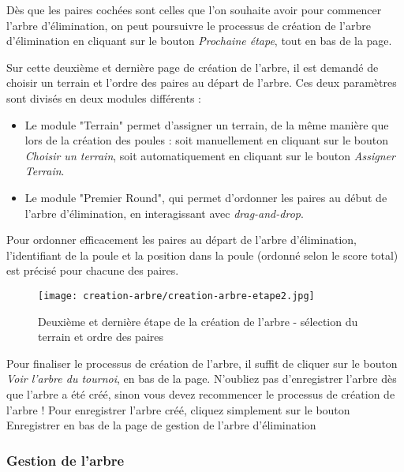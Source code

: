 Dès que les paires cochées sont celles que l'on souhaite avoir pour commencer l'arbre d'élimination, on peut poursuivre le processus de création de l'arbre d'élimination en cliquant sur le bouton \textit{Prochaine étape}, tout en bas de la page.\newline

Sur cette deuxième et dernière page de création de l'arbre, il est demandé de choisir un terrain et l'ordre des paires au départ de l'arbre. Ces deux paramètres sont divisés en deux modules différents :

\begin{itemize}
\item Le module "Terrain" permet d'assigner un terrain, de la même manière que lors de la création des poules : soit manuellement en cliquant sur le bouton \textit{Choisir un terrain}, soit automatiquement en cliquant sur le bouton \textit{Assigner Terrain}.
\item Le module "Premier Round", qui permet d'ordonner les paires au début de l'arbre d'élimination, en interagissant avec \textit{drag-and-drop}.
\end{itemize}
\bigskip

Pour ordonner efficacement les paires au départ de l'arbre d'élimination, l'identifiant de la poule et la position dans la poule (ordonné selon le score total) est précisé pour chacune des paires.

\begin{figure}[H]
\centering
\texttt{[image: creation-arbre/creation-arbre-etape2.jpg]}
\caption{Deuxième et dernière étape de la création de l'arbre - sélection du terrain et ordre des paires}
\end{figure}

Pour finaliser le processus de création de l'arbre, il suffit de cliquer sur le bouton \textit{Voir l'arbre du tournoi}, en bas de la page. N'oubliez pas d'enregistrer l'arbre dès que l'arbre a été créé, sinon vous devez recommencer le processus de création de l'arbre ! Pour enregistrer l'arbre créé, cliquez simplement sur le bouton Enregistrer en bas de la page de gestion de l'arbre d'élimination


\subsubsection{Gestion de l'arbre}